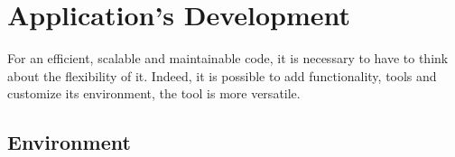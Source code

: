 

\section{Application's Development}


For an efficient, scalable and maintainable code, it is necessary to have to think about the flexibility of it. Indeed, it is possible to add functionality, tools and customize its environment, the tool is more versatile.



\subsection{Environment}




